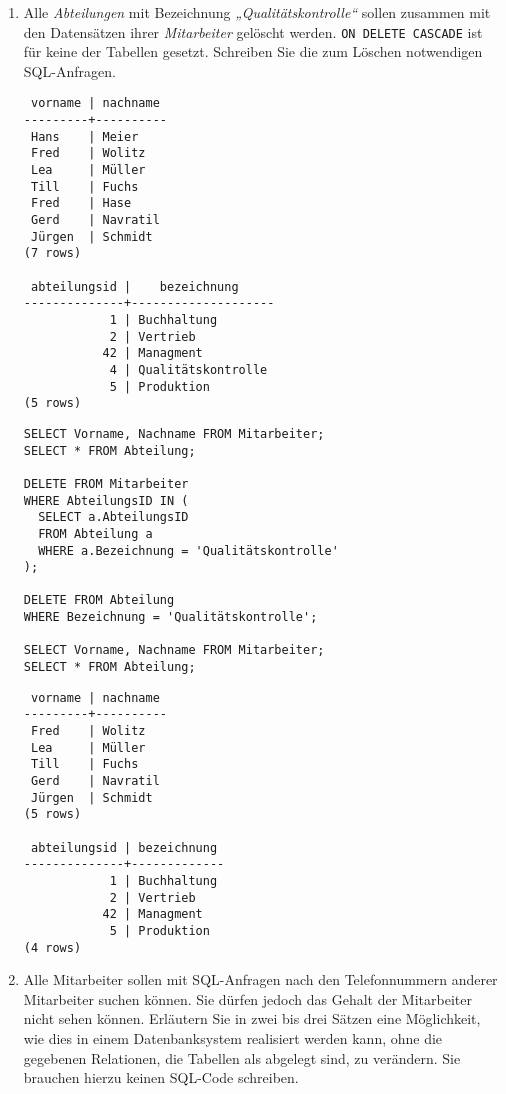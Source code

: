 \documentclass{bschlangaul-aufgabe}
\begin{document}
\begin{enumerate}

\item Alle \emph{Abteilungen} mit Bezeichnung
\emph{„Qualitätskontrolle“} sollen zusammen mit den Datensätzen ihrer
\emph{Mitarbeiter} gelöscht
werden. \verb|ON DELETE CASCADE| ist für keine der Tabellen gesetzt.
Schreiben Sie die zum Löschen notwendigen SQL-Anfragen.

\begin{bAntwort}
\begin{verbatim}
 vorname | nachname
---------+----------
 Hans    | Meier
 Fred    | Wolitz
 Lea     | Müller
 Till    | Fuchs
 Fred    | Hase
 Gerd    | Navratil
 Jürgen  | Schmidt
(7 rows)

 abteilungsid |    bezeichnung
--------------+--------------------
            1 | Buchhaltung
            2 | Vertrieb
           42 | Managment
            4 | Qualitätskontrolle
            5 | Produktion
(5 rows)
\end{verbatim}

\begin{verbatim}
SELECT Vorname, Nachname FROM Mitarbeiter;
SELECT * FROM Abteilung;

DELETE FROM Mitarbeiter
WHERE AbteilungsID IN (
  SELECT a.AbteilungsID
  FROM Abteilung a
  WHERE a.Bezeichnung = 'Qualitätskontrolle'
);

DELETE FROM Abteilung
WHERE Bezeichnung = 'Qualitätskontrolle';

SELECT Vorname, Nachname FROM Mitarbeiter;
SELECT * FROM Abteilung;
\end{verbatim}

\begin{verbatim}
 vorname | nachname
---------+----------
 Fred    | Wolitz
 Lea     | Müller
 Till    | Fuchs
 Gerd    | Navratil
 Jürgen  | Schmidt
(5 rows)

 abteilungsid | bezeichnung
--------------+-------------
            1 | Buchhaltung
            2 | Vertrieb
           42 | Managment
            5 | Produktion
(4 rows)
\end{verbatim}
\end{bAntwort}


\item Alle Mitarbeiter sollen mit SQL-Anfragen nach den Telefonnummern
anderer Mitarbeiter suchen können. Sie dürfen jedoch das Gehalt der
Mitarbeiter nicht sehen können. Erläutern Sie in zwei bis drei Sätzen
eine Möglichkeit, wie dies in einem Datenbanksystem realisiert werden
kann, ohne die gegebenen Relationen, die Tabellen als abgelegt sind, zu
verändern. Sie brauchen hierzu keinen SQL-Code schreiben.


\end{enumerate}
\end{document}
